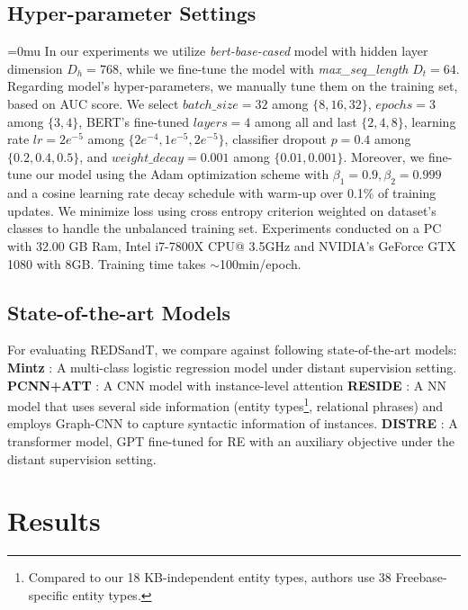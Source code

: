 \documentclass[11pt,a4paper]{article}
\begin{document}
\subsection{Hyper-parameter Settings}
\begingroup
\thickmuskip=0mu
\setlength{\thickmuskip}{0mu}
In our experiments we utilize \textit{bert-base-cased} model with hidden layer dimension $D_h=768$, while we fine-tune the model with \textit{max\_seq\_length} $D_t=64$. Regarding model's hyper-parameters, we manually tune them on the training set, based on AUC score. We select $batch\_size=32$ among $\{8, 16, 32\}$, $epochs=3$ among $\{3, 4\}$, BERT's fine-tuned $layers=4$ among all and last $\{2,4,8\}$, learning rate $lr=2e^{-5}$ among $\{2e^{-4}, 1e^{-5}, 2e^{-5}\}$, classifier dropout $p=0.4$ among $\{0.2, 0.4, 0.5\}$, and $weight\_decay=0.001$ among $\{0.01, 0.001\}$. Moreover, we fine-tune our model using the Adam optimization scheme \cite{Kingma2015} with $\beta_1 = 0.9, \beta_2 = 0.999$ and a cosine learning rate decay schedule with warm-up over 0.1\% of training updates. We minimize loss using cross entropy criterion weighted on dataset's classes to handle the unbalanced training set. Experiments conducted on a PC with 32.00 GB Ram, Intel i7-7800X CPU@ 3.5GHz and NVIDIA's GeForce GTX 1080 with 8GB. Training time takes $\sim$100min/epoch.
\endgroup


\subsection{State-of-the-art Models}
For evaluating REDSandT, we compare against following state-of-the-art models:
\newline
\textbf{Mintz} \cite{Mintz2009}: A multi-class logistic regression model under distant supervision setting.
\newline
\textbf{PCNN+ATT} \cite{Lin2016}: A CNN model with instance-level attention
\newline
\textbf{RESIDE} \cite{Vashishth2018}: A NN model that uses several side information (entity types\footnote{Compared to our 18 KB-independent entity types, authors use 38 Freebase-specific entity types.}, relational phrases) and employs Graph-CNN to capture syntactic information of instances. 
\newline
\textbf{DISTRE} \cite{Alt2019}: A transformer model, GPT fine-tuned for RE with an auxiliary objective under the distant supervision setting.



\section{Results}
\label{sec:results}
\end{document}
